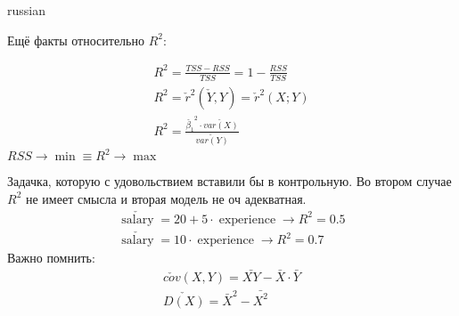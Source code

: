 \documentclass{article}
\begin{document}
\begin{otherlanguage*}{russian}
\begin{enumerate}
Ещё факты относительно $ R^ 2$: 

\begin{align}
R ^ 2 = \frac{TSS - RSS}{TSS} = 1 - \frac{RSS}{TSS} \\
R^2 = \check{r}^ 2 (\check{Y}, Y) = \check{r}^2 (X; Y)\\
R^2 = \frac{\check{\beta_1}^2 \cdot \check{var (X)}}{\check{var (Y)}} 
\end{align}
$ RSS \rightarrow \min \equiv R^2 \rightarrow \max$

Задачка, которую с удовольствием вставили бы в контрольную. Во втором случае $ R ^ 2 $ не имеет смысла и вторая модель не оч адекватная. 
\begin{align}
\check{\operatorname{salary}} = 20 + 5 \cdot \operatorname{experience} \rightarrow R^2 = 0.5 \\
\check{\operatorname{salary}} = 10 \cdot \operatorname{experience} \rightarrow R^2 = 0.7 
\end{align}
Важно помнить: 
\begin{align}
\check{cov} (X, Y) = \bar{XY} - \bar{X} \cdot \bar{Y} \\ 
\check{D(X)} = \bar{X} ^ 2 - \bar{X^2} 
\end{align}
\end{enumerate}
\end{otherlanguage*}
\end{document}
